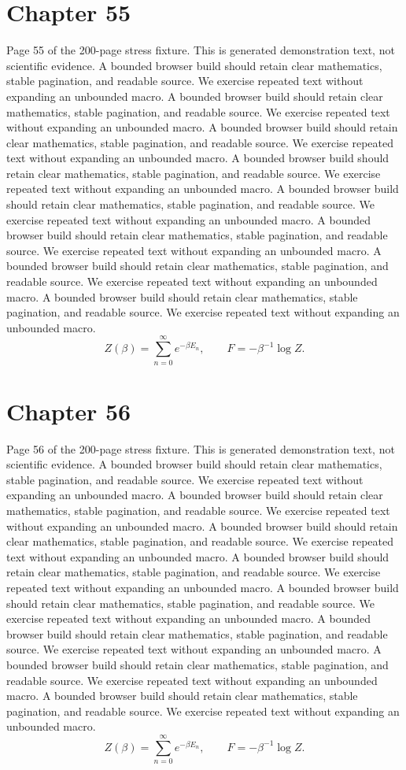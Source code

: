 \documentclass[11pt]{article}
\begin{document}
\section*{Chapter 55}
Page 55 of the 200-page stress fixture. This is generated demonstration text, not scientific evidence.
A bounded browser build should retain clear mathematics, stable pagination, and readable source. We exercise repeated text without expanding an unbounded macro.
A bounded browser build should retain clear mathematics, stable pagination, and readable source. We exercise repeated text without expanding an unbounded macro.
A bounded browser build should retain clear mathematics, stable pagination, and readable source. We exercise repeated text without expanding an unbounded macro.
A bounded browser build should retain clear mathematics, stable pagination, and readable source. We exercise repeated text without expanding an unbounded macro.
A bounded browser build should retain clear mathematics, stable pagination, and readable source. We exercise repeated text without expanding an unbounded macro.
A bounded browser build should retain clear mathematics, stable pagination, and readable source. We exercise repeated text without expanding an unbounded macro.
A bounded browser build should retain clear mathematics, stable pagination, and readable source. We exercise repeated text without expanding an unbounded macro.
A bounded browser build should retain clear mathematics, stable pagination, and readable source. We exercise repeated text without expanding an unbounded macro.
\[Z(\beta)=\sum_{n=0}^{\infty}e^{-\beta E_n},\qquad F=-\beta^{-1}\log Z.\]
\newpage
\section*{Chapter 56}
Page 56 of the 200-page stress fixture. This is generated demonstration text, not scientific evidence.
A bounded browser build should retain clear mathematics, stable pagination, and readable source. We exercise repeated text without expanding an unbounded macro.
A bounded browser build should retain clear mathematics, stable pagination, and readable source. We exercise repeated text without expanding an unbounded macro.
A bounded browser build should retain clear mathematics, stable pagination, and readable source. We exercise repeated text without expanding an unbounded macro.
A bounded browser build should retain clear mathematics, stable pagination, and readable source. We exercise repeated text without expanding an unbounded macro.
A bounded browser build should retain clear mathematics, stable pagination, and readable source. We exercise repeated text without expanding an unbounded macro.
A bounded browser build should retain clear mathematics, stable pagination, and readable source. We exercise repeated text without expanding an unbounded macro.
A bounded browser build should retain clear mathematics, stable pagination, and readable source. We exercise repeated text without expanding an unbounded macro.
A bounded browser build should retain clear mathematics, stable pagination, and readable source. We exercise repeated text without expanding an unbounded macro.
\[Z(\beta)=\sum_{n=0}^{\infty}e^{-\beta E_n},\qquad F=-\beta^{-1}\log Z.\]
\newpage
\end{document}
